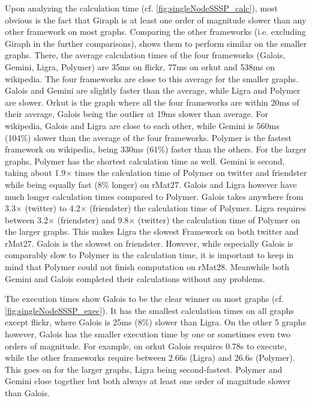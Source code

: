 Upon analyzing the calculation time (cf. \autoref{fig:singleNodeSSSP_calc}), most obvious is the fact that Giraph is at least one order of magnitude slower than any other framework on most graphs.
Comparing the other frameworks (i.e. excluding Giraph in the further comparisons), shows them to perform similar on the smaller graphs. There, the average calculation times of the four frameworks (Galois, Gemini, Ligra, Polymer) are 35ms on flickr, 77ms on orkut and 538ms on wikipedia. 
The four frameworks are close to this average for the smaller graphs. Galois and Gemini are slightly faster than the average, while Ligra and Polymer are slower.
Orkut is the graph where all the four frameworks are within 20ms of their average, Galois being the outlier at 19ms slower than average.
For wikipedia, Galois and Ligra are close to each other, while Gemini is 560ms (104\%) slower than the average of the four frameworks.
Polymer is the fastest framework on wikipedia, being 330ms (61\%) faster than the others.
For the larger graphs, Polymer has the shortest calculation time as well. Gemini is second, taking about 1.9$\times$ times the calculation time of Polymer on twitter and friendster while being equally fast (8\% longer) on rMat27. Galois and Ligra however have much longer calculation times compared to Polymer. Galois takes anywhere from 3.3$\times$ (twitter) to 4.2$\times$ (friendster) the calculation time of Polymer.
Ligra requires between 3.2$\times$ (friendster) and 9.8$\times$ (twitter) the calculation time of Polymer on the larger graphs. This makes Ligra the slowest Framework on both twitter and rMat27. Galois is the slowest on friendster.
However, while especially Galois is comparably slow to Polymer in the calculation time, it is important to keep in mind that Polymer could not finish computation on rMat28. Meanwhile both Gemini and Galois completed their calculations without any problems.

The execution times show Galois to be the clear winner on most graphs (cf. \autoref{fig:singleNodeSSSP_exec}).
It has the smallest calculation times on all graphs except flickr, where Galois is 25ms (8\%) slower than Ligra. 
On the other 5 graphs however, Galois has the smaller execution time by one or sometimes even two orders of magnitude. 
For example, on orkut Galois requires 0.78s to execute, while the other frameworks require between 2.66s (Ligra) and 26.6s (Polymer).
This goes on for the larger graphs, Ligra being second-fastest. Polymer and Gemini close together but both always at least one order of magnitude slower than Galois.

